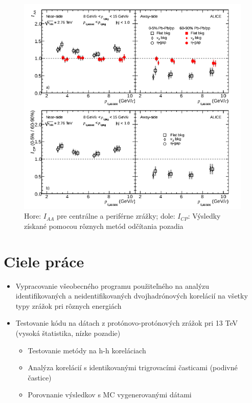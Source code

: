 \documentclass[thesismargins, thesislinespacing]{rnthesis}
\begin{document}
\begin{figure}[hbtp!]
	\centering
	\includegraphics[scale=1]{./Obrazky_praca/clanok2.png}
	\caption{ Hore: $I_{AA}$ pre centrálne a periférne zrážky; dole: $I_{CP}$: Výsledky získané pomocou rôznych metód odčítania pozadia~\cite{clanok}}
	\label{clanok2}
\end{figure}



\chapter{Ciele práce} 
\begin{itemize}
	\item Vypracovanie všeobecného programu použiteľného na analýzu identifikovaných a neidentifikovaných dvojhadrónových korelácií na všetky typy zrážok pri rôznych energiách
	\item Testovanie kódu na dátach z protónovo-protónových zrážok pri 13 TeV (vysoká štatistika, nízke pozadie)
	\begin{itemize}
		\item Testovanie metódy na h-h koreláciach
		\item Analýza korelácií s identikovanými trigrovacími časticami (podivné častice)
		\item Porovnanie výsledkov s MC vygenerovanými dátami 
	\end{itemize}
\end{itemize}
\end{document}
